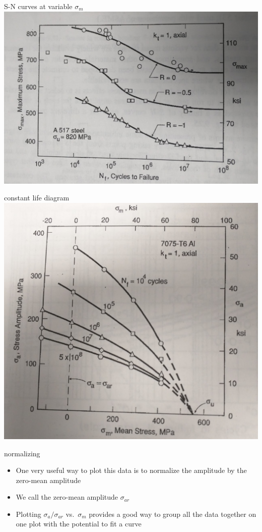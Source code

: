 \documentclass[
  letterpaper,
  ignorenonframetext,
  aspectratio=43,
  handout,
  12pt]{beamer}
\providecommand{\tightlist}{%
  \setlength{\itemsep}{0pt}\setlength{\parskip}{0pt}}
\providecommand{\tightlist}{%
\setlength{\itemsep}{0pt}\setlength{\parskip}{0pt}}
\let\Oldincludegraphics\includegraphics
\renewcommand{\includegraphics}[2][]{\Oldincludegraphics[width=\textwidth,height=0.7\textheight,keepaspectratio]{#2}}
\begin{document}
\begin{frame}{S-N curves at variable \(\sigma_m\)}
\protect\hypertarget{s-n-curves-at-variable-sigma_m}{}
\includegraphics{../images/meanstress.jpg}
\end{frame}

\begin{frame}{constant life diagram}
\protect\hypertarget{constant-life-diagram}{}
\includegraphics{../images/constant-life.jpg}
\end{frame}

\begin{frame}{normalizing}
\protect\hypertarget{normalizing}{}
\begin{itemize}
\tightlist
\item
  One very useful way to plot this data is to normalize the amplitude by
  the zero-mean amplitude
\item
  We call the zero-mean amplitude \(\sigma_{ar}\)
\item
  Plotting \(\sigma_a/\sigma_{ar}\) vs.~\(\sigma_m\) provides a good way
  to group all the data together on one plot with the potential to fit a
  curve
\end{itemize}
\end{frame}
\end{document}
